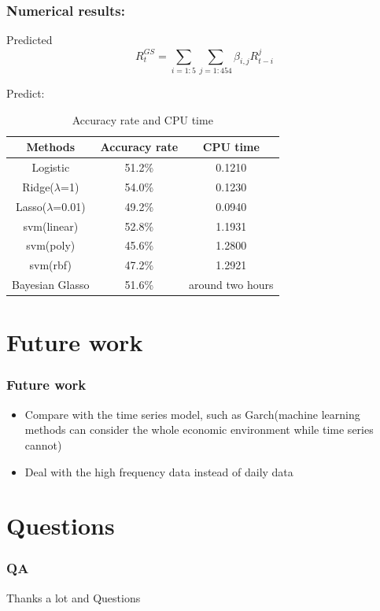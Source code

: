 \documentclass[xcolor={x11names,svgnames,dvipsnames}]{beamer}
\begin{document}
\begin{frame}
\frametitle{Numerical results:}
\begin{block}{Predicted}
\begin{equation}
R_t^{GS} = \sum_{i=1:5}{\sum_{j=1:454}\beta_{i,j}R_{t-i}^j}
\end{equation}
\end{block}

\begin{block}{Predict:}
\begin{table}[h!]\large
  \caption{Accuracy rate and CPU time}
\begin{center}
    \begin{tabular}{| c | c|c|}
    \hline
    Methods& Accuracy rate& CPU time \\
    \hline
Logistic  &51.2\%&0.1210\\
Ridge($\lambda$=1)&54.0\%&0.1230\\
Lasso($\lambda$=0.01)&49.2\%&0.0940\\
svm(linear)&52.8\%&1.1931\\
svm(poly)&45.6\%&1.2800	\\
svm(rbf)&47.2\%&1.2921\\
Bayesian Glasso&51.6\%&around two hours\\
\hline
\end{tabular}
\end{center}
\end{table}
\end{block}
\end{frame}



\section{Future work}
\begin{frame}
\frametitle{Future work}
    \begin{itemize}
        \item  Compare with the time series model, such as Garch(machine learning methods can consider the whole economic environment while time series cannot)
        \item  Deal with the high frequency data instead of daily data
      \end{itemize}
\end{frame}

\section{Questions}
\begin{frame}
\frametitle{QA}
\begin{center}
\huge{Thanks a lot and Questions}
\end{center}
\end{frame}
\end{document}
